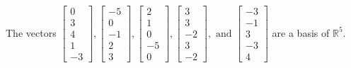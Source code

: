 \begin{exercise}
\begin{exerciseStatement}
  \end{exerciseStatement}
  \begin{exerciseAnswer}
   The vectors \(\left[\begin{array}{r}
0 \\
3 \\
4 \\
1 \\
-3
\end{array}\right] , \left[\begin{array}{r}
-5 \\
0 \\
-1 \\
2 \\
3
\end{array}\right] , \left[\begin{array}{r}
2 \\
1 \\
0 \\
-5 \\
0
\end{array}\right] , \left[\begin{array}{r}
3 \\
3 \\
-2 \\
3 \\
-2
\end{array}\right] , \text{ and } \left[\begin{array}{r}
-3 \\
-1 \\
3 \\
-3 \\
4
\end{array}\right]\) 
  	 are  a basis of \(\mathbb{R}^5\).
  


  \end{exerciseAnswer}
\end{exercise}